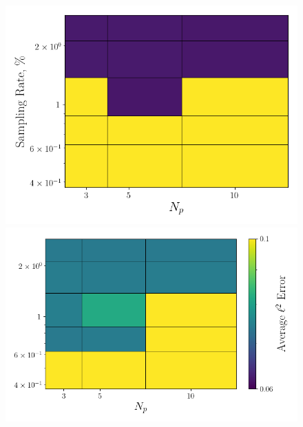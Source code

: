 

\begin{figure}
	\begin{minipage}{0.46\linewidth}
		\includegraphics[width=0.99\linewidth]{Chapters/AdaptiveResults/Images/cvrc/errContours/err_contour_iter2.png}
	\end{minipage}
	\begin{minipage}{0.53\linewidth}
		\includegraphics[width=0.99\linewidth]{Chapters/AdaptiveResults/Images/cvrc/errContours/err_contour_iter3.png}
	\end{minipage}


\end{figure}
